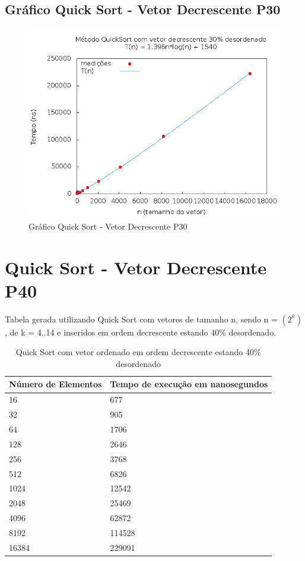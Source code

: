 \documentclass[12pt,a4paper,twoside]{report}
\begin{document}
\subsection{Gráfico Quick Sort - Vetor Decrescente P30}
\begin{figure}[H]
    \centering
    \includegraphics[width=0.7\linewidth]{graficos/QuickSort/vIntDecrescenteP30/vIntDecrescenteP30.png}
  \caption{Gráfico Quick Sort - Vetor Decrescente P30}
\end{figure}

\section{Quick Sort - Vetor Decrescente P40}
Tabela gerada utilizando Quick Sort com vetores de tamanho n, sendo n = $(2^k)$, de k = 4..14 e inseridos em ordem decrescente estando 40\% desordenado.
\begin{table}[H]
\centering
\caption{Quick Sort com vetor ordenado em ordem decrescente estando 40\% desordenado}
\label{my-label}
\begin{tabular}{|l|l|}
\hline
\multicolumn{1}{|c|}{\textbf{Número de Elementos}} & \multicolumn{1}{c|}{\textbf{Tempo de execução em nanosegundos}} \\ \hline
16 & 677 \\ \hline
32 & 905 \\ \hline
64 & 1706 \\ \hline
128 & 2646 \\ \hline
256 & 3768 \\ \hline
512 & 6826 \\ \hline
1024 & 12542 \\ \hline
2048 & 25469 \\ \hline
4096 & 62872 \\ \hline
8192 & 114528 \\ \hline
16384 & 229091 \\ \hline
\end{tabular}
\end{table}
\end{document}
